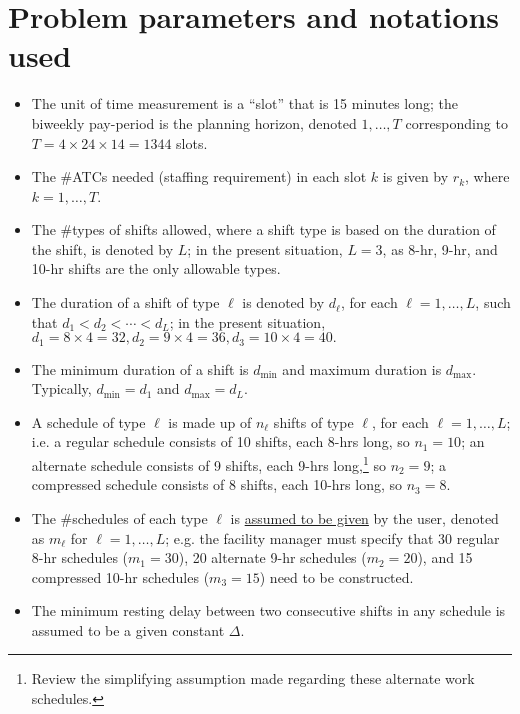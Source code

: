 \documentclass[11pt]{article}
\begin{document}
\section{Problem parameters and notations used}
\begin{itemize}
\item The unit of time measurement is a ``slot'' that is 15 minutes long; the biweekly pay-period is the planning horizon, denoted $1,\ldots,T$ corresponding to $T = 4\times 24 \times 14 = 1344$ slots.

\item The \#ATCs needed (staffing requirement) in each slot $k$ is given by $r_k$, where $k = 1,\ldots,T$.

\item The \#types of shifts allowed, where a shift type is based on the duration of the shift, is denoted by $L$; in the present situation, $L=3$, as 8-hr, 9-hr, and 10-hr shifts are the only allowable types. 

\item The duration of a shift of type $\ell$ is denoted by $d_\ell$, for each $\ell =1,\ldots,L$, such that $d_1 < d_2 < \cdots < d_L$; in the present situation, $d_1 = 8 \times 4 = 32, d_2 = 9 \times 4 = 36, d_3 = 10 \times 4 = 40.$

\item The minimum duration of a shift is $d_{\min}$ and maximum duration is $d_{\max}$. Typically, $d_{\min} = d_1$ and $d_{\max} = d_L$.

\item A schedule of type $\ell$ is made up of $n_\ell$ shifts of type $\ell$,  for each $\ell = 1,\ldots,L$; i.e. a regular schedule consists of 10 shifts, each 8-hrs long, so $n_1 = 10$; an alternate schedule consists of 9 shifts, each 9-hrs long,\footnote{Review the simplifying assumption made regarding these alternate work schedules.} so $n_2 = 9$; a compressed schedule consists of 8 shifts, each 10-hrs long, so $n_3 = 8$. 

\item The \#schedules of each type $\ell$ is \underline{assumed to be given} by the user, denoted as $m_\ell$ for  $\ell =1,\ldots,L$; e.g. the facility manager must specify that 30 regular 8-hr schedules ($m_1 = 30$), 20 alternate 9-hr schedules ($m_2 = 20$), and 15 compressed 10-hr schedules ($m_3 = 15$) need to be constructed.

\item The minimum resting delay between two consecutive shifts in any schedule is assumed to be a given constant $\Delta$. 

\end{itemize}
\end{document}

